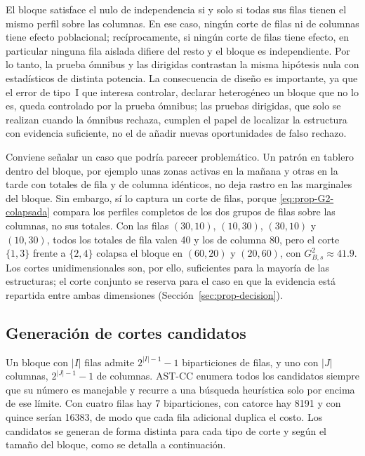 \begin{observacion}\label{obs:nulo-comun}
El bloque satisface el nulo de independencia si y solo si todas sus filas tienen
el mismo perfil sobre las columnas. En ese caso, ningún corte de filas ni de
columnas tiene efecto poblacional; recíprocamente, si ningún corte de filas
tiene efecto, en particular ninguna fila aislada difiere del resto y el bloque
es independiente. Por lo tanto, la prueba ómnibus y las dirigidas contrastan la
misma hipótesis nula con estadísticos de distinta potencia. La consecuencia de
diseño es importante, ya que el error de tipo~I que interesa controlar, declarar
heterogéneo un bloque que no lo es, queda controlado por la prueba ómnibus; las
pruebas dirigidas, que solo se realizan cuando la ómnibus rechaza, cumplen el
papel de localizar la estructura con evidencia suficiente, no el de
añadir nuevas oportunidades de falso rechazo.
\end{observacion}

Conviene señalar un caso que podría parecer problemático. Un patrón en tablero
dentro del bloque, por ejemplo unas zonas activas en la mañana y otras en la
tarde con totales de fila y de columna idénticos, no deja rastro en las
marginales del bloque. Sin embargo, sí lo captura un corte de filas, porque
\eqref{eq:prop-G2-colapsada} compara los perfiles completos de los dos
grupos de filas sobre las columnas, no sus totales. Con las filas $(30,10)$,
$(10,30)$, $(30,10)$ y $(10,30)$, todos los totales de fila valen 40 y los de
columna 80, pero el corte $\{1,3\}$ frente a $\{2,4\}$ colapsa el bloque en
$(60,20)$ y $(20,60)$, con $G^2_{B,s}\approx 41.9$. Los cortes unidimensionales
son, por ello, suficientes para la mayoría de las estructuras; el corte conjunto
se reserva para el caso en que la evidencia está repartida entre ambas
dimensiones (Sección~\ref{sec:prop-decision}).

\subsection{Generación de cortes candidatos}\label{sec:prop-candidatos}

Un bloque con $|I|$ filas admite $2^{|I|-1}-1$ biparticiones de filas, y uno
con $|J|$ columnas, $2^{|J|-1}-1$ de columnas. AST-CC enumera todos los
candidatos siempre que su número es manejable y recurre a una búsqueda
heurística solo por encima de ese límite. Con cuatro filas hay 7 biparticiones,
con catorce hay 8191 y con quince serían 16383, de modo que cada fila adicional
duplica el costo. Los candidatos se generan de forma
distinta para cada tipo de corte y según el tamaño del bloque, como se detalla a
continuación.

